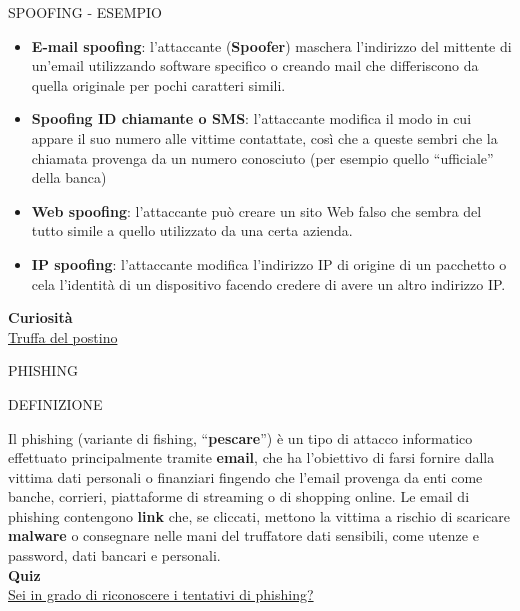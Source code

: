 \documentclass[aspectratio=1610]{beamer}
\begin{document}
\begin{frame}{SPOOFING - ESEMPIO}
    \begin{itemize}
        \item \textbf{E-mail spoofing}: l'attaccante (\textbf{Spoofer}) maschera l'indirizzo del mittente di un'email 
        utilizzando software specifico o creando mail che differiscono da quella originale per 
        pochi caratteri simili.
        \pause
        \item \textbf{Spoofing ID chiamante o SMS}: l'attaccante modifica il modo in cui appare il suo 
        numero alle vittime contattate, così che a queste sembri che la chiamata provenga da un numero 
        conosciuto (per esempio quello ``ufficiale'' della banca)
        \pause
        \item \textbf{Web spoofing}: l'attaccante può creare un sito Web falso che 
        sembra del tutto simile a quello utilizzato da una certa azienda.
        \pause
        \item \textbf{IP spoofing}: l'attaccante modifica l'indirizzo IP di origine di un pacchetto o 
        cela l'identità di un dispositivo facendo credere di avere un altro indirizzo IP. 
    \end{itemize}
    \tiny{\textbf{Curiosità}}\\
    \tiny{\href{https://www.geopop.it/una-lettera-contenente-un-qr-code-puo-svuotarvi-il-conto-come-riconoscere-la-truffa-del-postino/}{Truffa del postino}}
\end{frame}

\begin{frame}{PHISHING}
    \begin{alertblock}{DEFINIZIONE}
        \begin{minipage}{0.98\linewidth}
            \justifying
            Il phishing (variante di fishing, ``\textbf{pescare}'') è un tipo di attacco informatico effettuato principalmente tramite \textbf{email}, 
            che ha l'obiettivo di farsi fornire dalla vittima dati personali o finanziari fingendo che 
            l'email provenga da enti come banche, corrieri, piattaforme di streaming o di shopping online. 
            Le email di phishing contengono \textbf{link} che, se cliccati, mettono la vittima a rischio di scaricare 
            \textbf{malware} o consegnare nelle mani del truffatore dati sensibili, come utenze e password, dati bancari 
            e personali.\\
            \bigskip
            \tiny{\textbf{Quiz}}\\
            \tiny{\href{https://phishingquiz.withgoogle.com/}{Sei in grado di riconoscere i tentativi di phishing?}}
        \end{minipage}
    \end{alertblock}
\end{frame}
\end{document}

